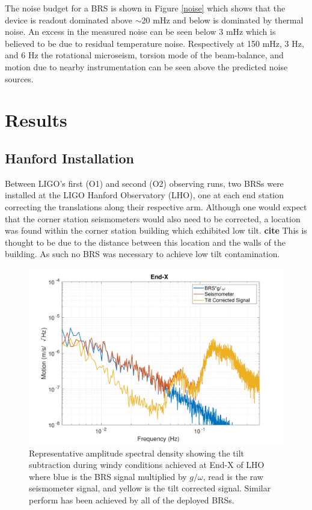 \documentclass [12pt, proquest]{uwthesis}[2019]
\begin{document}
 The noise budget for a BRS is shown in Figure \ref{noise} which shows that the device is readout dominated above $\sim$20 mHz and below is dominated by thermal noise. An excess in the measured noise can be seen below 3 mHz which is believed to be due to residual temperature noise. Respectively at 150 mHz, 3 Hz, and 6 Hz the rotational microseism, torsion mode of the beam-balance, and motion due to nearby instrumentation can be seen above the predicted noise sources.

\section{Results}\label{results}
\subsection{Hanford Installation} \label{BRS_Hanford}

\quad Between LIGO's first (O1) and second (O2) observing runs, two BRSs were installed at the LIGO Hanford Observatory (LHO), one at each end station correcting the translations along their respective arm. Although one would expect that the corner station seismometers would also need to be corrected, a location was found within the corner station building which exhibited low tilt. \textbf{cite} This is thought to be due to the distance between this location and the walls of the building. As such no BRS was necessary to achieve low tilt contamination.

\begin{figure}%
\begin{center}
\includegraphics[width=\textwidth]{HSubtractionETMX.pdf}
\caption{Representative amplitude spectral density showing the tilt subtraction during windy conditions achieved at End-X of LHO where blue is the BRS signal multiplied by $g/\omega$, read is the raw seismometer signal, and yellow is the tilt corrected signal. Similar perform has been achieved by all of the deployed BRSs.}
\label{sub}
\end{center}
\end{figure}
\end{document}
